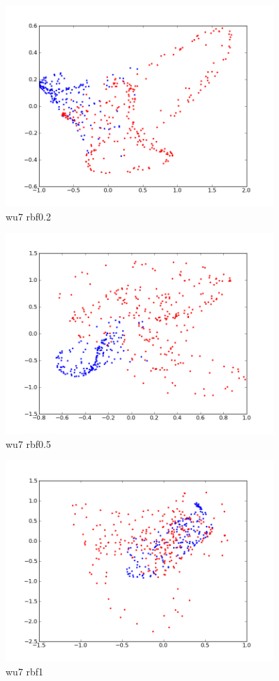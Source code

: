 \begin{figure}[here]
	\center
	\caption{wu7 rbf0.2}
	\label{fig:wu7_rbf0_2}
	\includegraphics[width=4.0in]{img/wu7_rbf0_2.png}
\end{figure}

\begin{figure}[here]
	\center
	\caption{wu7 rbf0.5}
	\label{fig:wu7_rbf0_5}
	\includegraphics[width=4.0in]{img/wu7_rbf0_5.png}
\end{figure}

\begin{figure}[here]
	\center
	\caption{wu7 rbf1}
	\label{fig:wu7_rbf1}
	\includegraphics[width=4.0in]{img/wu7_rbf1.png}
\end{figure}

